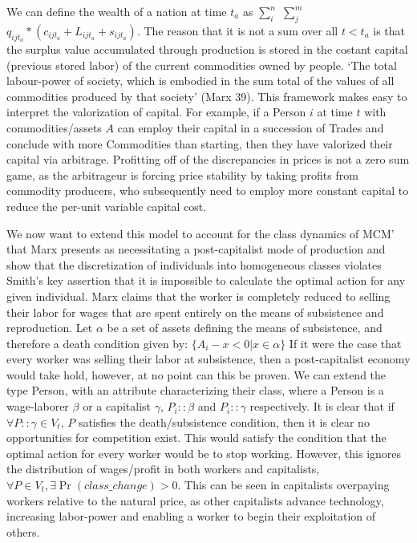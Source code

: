\documentclass[12pt]{article}
\begin{document}
We can define the wealth of a nation at time $t_a$ as $\sum\limits_i^n$ $\sum\limits_j^m$ $q_{ijt_{a}} * (c_{ijt_{a}} + L_{ijt_{a}} + s_{ijt_{a}})$. 
The reason that it is not a sum over all $t < t_a$ is that the surplus value accumulated through production is stored in the costant capital (previous stored labor) of the current commodities owned by people. `The total labour-power of society, which is embodied in the sum total of the values of all commodities produced by that society' (Marx 39).
This framework makes easy to interpret the valorization of capital.
For example, if a Person $i$ at time $t$ with commodities/assets $A$ can employ their capital in a succession of Trades and conclude with more Commodities than starting, then they have valorized their capital via arbitrage.
Profitting off of the discrepancies in prices is not a zero sum game, as the arbitrageur is forcing price stability by taking profits from commodity producers, who subsequently need to employ more constant capital to reduce the per-unit variable capital cost. \par
We now want to extend this model to account for the class dynamics of MCM' that Marx presents as necessitating a post-capitalist mode of production and show that the discretization of individuals into homogeneous classes violates Smith's key assertion that it is impossible to calculate the optimal action for any given individual.
Marx claims that the worker is completely reduced to selling their labor for wages that are spent entirely on the means of subsistence and reproduction. 
Let $\alpha$ be a set of assets defining the means of subsistence, and therefore a death condition given by: $\{A_i - x < 0| x \in \alpha \}$  
If it were the case that every worker was selling their labor at subsistence, then a post-capitalist economy would take hold, however, at no point can this be proven. 
We can extend the type Person, with an attribute characterizing their class, where a Person is a wage-laborer $\beta$ or a capitalist $\gamma$, $P_i::\beta$ and $P_i::\gamma$ respectively.
It is clear that if $\forall P::\gamma \in V_t$, $P$ satisfies the death/subsistence condition, then it is clear no opportunities for competition exist. 
This would satisfy the condition that the optimal action for every worker would be to stop working.
However, this ignores the distribution of wages/profit in both workers and capitalists, $\forall P \in V_t, \exists \Pr(class\_change) > 0$.
This can be seen in capitalists overpaying workers relative to the natural price, as other capitalists advance technology, increasing labor-power and enabling a worker to begin their exploitation of others.
\end{document}
